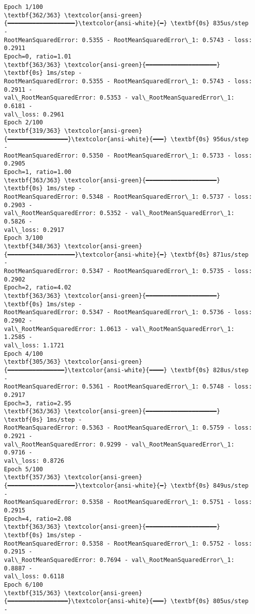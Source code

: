 \documentclass[12pt letter]{report}
\begin{document}
    \begin{Verbatim}[commandchars=\\\{\}]
Epoch 1/100
\textbf{362/363} \textcolor{ansi-green}{━━━━━━━━━━━━━━━━━━━}\textcolor{ansi-white}{━} \textbf{0s} 835us/step -
RootMeanSquaredError: 0.5355 - RootMeanSquaredError\_1: 0.5743 - loss: 0.2911
Epoch=0, ratio=1.01
\textbf{363/363} \textcolor{ansi-green}{━━━━━━━━━━━━━━━━━━━━} \textbf{0s} 1ms/step -
RootMeanSquaredError: 0.5355 - RootMeanSquaredError\_1: 0.5743 - loss: 0.2911 -
val\_RootMeanSquaredError: 0.5353 - val\_RootMeanSquaredError\_1: 0.6181 -
val\_loss: 0.2961
Epoch 2/100
\textbf{319/363} \textcolor{ansi-green}{━━━━━━━━━━━━━━━━━}\textcolor{ansi-white}{━━━} \textbf{0s} 956us/step -
RootMeanSquaredError: 0.5350 - RootMeanSquaredError\_1: 0.5733 - loss: 0.2905
Epoch=1, ratio=1.00
\textbf{363/363} \textcolor{ansi-green}{━━━━━━━━━━━━━━━━━━━━} \textbf{0s} 1ms/step -
RootMeanSquaredError: 0.5348 - RootMeanSquaredError\_1: 0.5737 - loss: 0.2903 -
val\_RootMeanSquaredError: 0.5352 - val\_RootMeanSquaredError\_1: 0.5826 -
val\_loss: 0.2917
Epoch 3/100
\textbf{348/363} \textcolor{ansi-green}{━━━━━━━━━━━━━━━━━━━}\textcolor{ansi-white}{━} \textbf{0s} 871us/step -
RootMeanSquaredError: 0.5347 - RootMeanSquaredError\_1: 0.5735 - loss: 0.2902
Epoch=2, ratio=4.02
\textbf{363/363} \textcolor{ansi-green}{━━━━━━━━━━━━━━━━━━━━} \textbf{0s} 1ms/step -
RootMeanSquaredError: 0.5347 - RootMeanSquaredError\_1: 0.5736 - loss: 0.2902 -
val\_RootMeanSquaredError: 1.0613 - val\_RootMeanSquaredError\_1: 1.2585 -
val\_loss: 1.1721
Epoch 4/100
\textbf{305/363} \textcolor{ansi-green}{━━━━━━━━━━━━━━━━}\textcolor{ansi-white}{━━━━} \textbf{0s} 828us/step -
RootMeanSquaredError: 0.5361 - RootMeanSquaredError\_1: 0.5748 - loss: 0.2917
Epoch=3, ratio=2.95
\textbf{363/363} \textcolor{ansi-green}{━━━━━━━━━━━━━━━━━━━━} \textbf{0s} 1ms/step -
RootMeanSquaredError: 0.5363 - RootMeanSquaredError\_1: 0.5759 - loss: 0.2921 -
val\_RootMeanSquaredError: 0.9299 - val\_RootMeanSquaredError\_1: 0.9716 -
val\_loss: 0.8726
Epoch 5/100
\textbf{357/363} \textcolor{ansi-green}{━━━━━━━━━━━━━━━━━━━}\textcolor{ansi-white}{━} \textbf{0s} 849us/step -
RootMeanSquaredError: 0.5358 - RootMeanSquaredError\_1: 0.5751 - loss: 0.2915
Epoch=4, ratio=2.08
\textbf{363/363} \textcolor{ansi-green}{━━━━━━━━━━━━━━━━━━━━} \textbf{0s} 1ms/step -
RootMeanSquaredError: 0.5358 - RootMeanSquaredError\_1: 0.5752 - loss: 0.2915 -
val\_RootMeanSquaredError: 0.7694 - val\_RootMeanSquaredError\_1: 0.8887 -
val\_loss: 0.6118
Epoch 6/100
\textbf{315/363} \textcolor{ansi-green}{━━━━━━━━━━━━━━━━━}\textcolor{ansi-white}{━━━} \textbf{0s} 805us/step -

\end{Verbatim}
\end{document}
